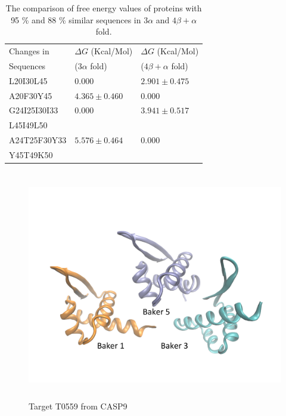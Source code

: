 \documentclass[12pt]{article}
\begin{document}
\begin{table}
\caption{The comparison of free energy values of proteins with 95 \% and 88 \% similar sequences in $3 \alpha$ and $4 \beta + \alpha$ fold.}
\label{tab:GA_GB}
\begin{center}
\begin{tabular}{l l l}\hline
Changes in   &     $\Delta G$ (Kcal/Mol) &  $\Delta G$ (Kcal/Mol) \\
 Sequences   &     ($3 \alpha$ fold)       & ($4 \beta + \alpha$ fold) \\ \hline
L20I30L45    &     $0.000$            &  $2.901 \pm 0.475$   \\
A20F30Y45    &     $4.365 \pm 0.460$ &  $0.000$    \\
G24I25I30I33 &     $0.000$            &  $ 3.941 \pm 0.517$ \\
L45I49L50    &                        &              \\
A24T25F30Y33 &     $5.576 \pm 0.464$  &  $0.000$     \\
Y45T49K50    &                        &             \\ \hline
\end{tabular}
\end{center}
\end{table}


\begin{figure}
\begin{center}
\includegraphics[width=12cm,height=10cm]{T0559.pdf}
\end{center}
\caption{Target T0559 from CASP9}
\label{fig:T0559}
\end{figure}
\end{document}
